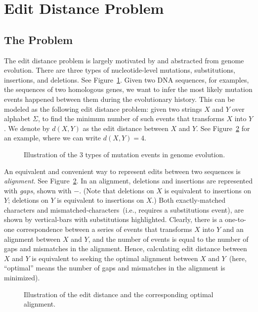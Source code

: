 \section{Edit Distance Problem}

\subsection*{The Problem}

The edit distance problem is largely motivated by and abstracted from genome evolution.
There are three types of nucleotide-level mutations, substitutions, insertions, and deletions.
See Figure~\ref{fig:edits}. Given two DNA sequences, for examples, the sequences of two homologous genes,
we want to infer the most likely mutation events happened between them during the evolutionary history.
This can be modeled as the following edit distance problem: given two strings $X$ and $Y$ over alphabet $\Sigma$,
to find the minimum number of such events that transforms $X$ into $Y$.
We denote by $d(X, Y)$ as the edit distance between $X$ and $Y$.
See Figure~\ref{fig:align} for an example, where we can write $d(X, Y) = 4$.

\begin{figure}[h]
\centering{}
\caption{Illustration of the 3 types of mutation events in genome evolution.}
\label{fig:edits}
\end{figure}

An equivalent and convenient way to represent edits between two sequences 
is \emph{alignment}. See Figure~\ref{fig:align}.
In an alignment, deletions and insertions are represented with \emph{gaps}, shown with $-$.
(Note that deletions on $X$ is equivalent to insertions on $Y$;
deletions on $Y$ is equivalent to insertions on $X$.)
Both exactly-matched characters and mismatched-characters~(i.e., requires a substitutions event),
are shown by vertical-bars with substitutions highlighted.
Clearly, there is a one-to-one correspondence between a series
of events that transforms $X$ into $Y$ and an alignment between $X$ and $Y$,
and the number of events is equal to the number of gaps and mismatches in the alignment.
Hence, calculating edit distance between $X$ and $Y$ is equivalent to
seeking the optimal alignment between $X$ and $Y$~(here, ``optimal'' means
the number of gaps and mismatches in the alignment is minimized).

\begin{figure}[h]
\centering{}
\caption{Illustration of the edit distance and the corresponding optimal alignment.}
\label{fig:align}
\end{figure}


